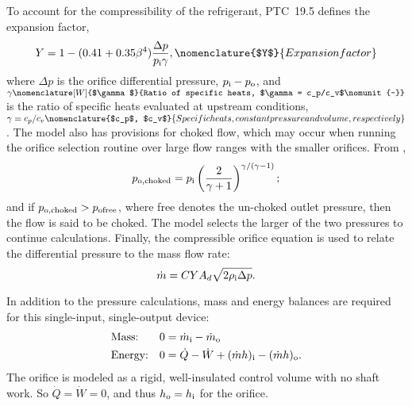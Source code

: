 To account for the compressibility of the refrigerant, PTC~19.5 defines
the expansion factor,
\begin{equation}
Y = 1 - (0.41 + 0.35 \beta^4) \frac{\Delta p}{p_{\inl}\gamma},
\nomenclature{$Y$}{Expansion factor\nomunit{-}}
\end{equation}
where $\Delta p$ is the orifice differential pressure, $p_{\text{i}}-p_{\text{o}}$, and
$\gamma\nomenclature[W]{$\gamma$}{Ratio of specific heats, $\gamma = c_p/c_v$\nomunit{-}}$ 
is the ratio of specific heats evaluated at upstream conditions, 
$\gamma = c_p/c_v\nomenclature{$c_p$, $c_v$}{Specific heats, constant pressure and volume, respectively\nomunit{\btu\per\poundmass\rankine}}$.
%
%
%
%
%
The model also has provisions for choked flow, which may occur when 
running the orifice selection routine over large flow ranges with the smaller orifices.
From \textcite{munson2009}, 
\begin{equation}
p_{\text{o},\text{choked}} = p_{\text{i}} \left(\frac{2}{\gamma+1}\right)^{\gamma/(\gamma-1)};
\end{equation}
and if $p_{\text{o},\text{choked}} > p_{\text{o}\text{free}}$, where free denotes 
the un-choked outlet pressure, then the flow is said to be choked.
The model selects the larger of the two pressures to continue calculations.
Finally, the compressible orifice equation is used to relate the differential pressure to the mass flow rate:
\begin{equation}
\dot{m} = C Y A_d \sqrt{2\rho_{\text{i}} \Delta p}.
\end{equation}

In addition to the pressure calculations, mass and energy balances are required
for this single-input, single-output device:
\begin{align}
  &\text{Mass:}   & 0 &= {\dot{m}_{\inl}} - {\dot{m}_{\out}} \\ %
  &\text{Energy:} & 0 &= \dot{Q} - \dot{W} + {(\dot{m}h)_{\inl}} - 
		{(\dot{m}h)_{\out}} \label{eqn:OrifEnergy}.
\end{align}
The orifice is modeled as a rigid, well-insulated control volume with no shaft work. 
So $\dot{Q}=\dot{W}=0$, and thus $h_{\text{o}} = h_{\text{i}}$ for the orifice.

